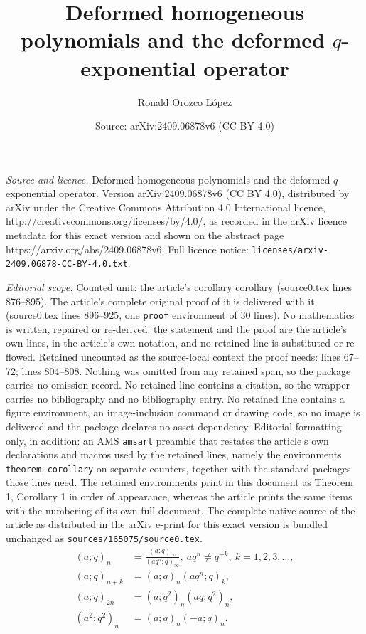 \documentclass[10pt,a4paper]{amsart}
\title{Deformed homogeneous polynomials and the deformed $q$-exponential operator}
\author{Ronald Orozco L\'opez}
\date{Source: arXiv:2409.06878v6 (CC BY 4.0)}
\begin{document}
\maketitle

\noindent\emph{Source and licence.} Deformed homogeneous polynomials and the deformed $q$-exponential operator. Version arXiv:2409.06878v6 (CC BY 4.0), distributed by arXiv under the Creative Commons Attribution 4.0 International licence, http://creativecommons.org/licenses/by/4.0/, as recorded in the arXiv licence metadata for this exact version and shown on the abstract page https://arxiv.org/abs/2409.06878v6. Full licence notice: \texttt{licenses/arxiv-2409.06878-CC-BY-4.0.txt}.\par\smallskip

\noindent\textit{Editorial scope.} Counted unit: the article's corollary corollary (source0.tex lines 876--895). The article's complete original proof of it is delivered with it (source0.tex lines 896--925, one \texttt{proof} environment of 30 lines). No mathematics is written, repaired or re-derived: the statement and the proof are the article's own lines, in the article's own notation, and no retained line is substituted or re-flowed.  Retained uncounted as the source-local context the proof needs: lines 67--72; lines 804--808.  Nothing was omitted from any retained span, so the package carries no omission record.  No retained line contains a citation, so the wrapper carries no bibliography and no bibliography entry.  No retained line contains a figure environment, an image-inclusion command or drawing code, so no image is delivered and the package declares no asset dependency.  Editorial formatting only, in addition: an AMS \texttt{amsart} preamble that restates the article's own declarations and macros used by the retained lines, namely the environments \texttt{theorem}, \texttt{corollary} on separate counters, together with the standard packages those lines need.  The retained environments print in this document as Theorem 1, Corollary 1 in order of appearance, whereas the article prints the same items with the numbering of its own full document.  The complete native source of the article as distributed in the arXiv e-print for this exact version is bundled unchanged as \texttt{sources/165075/source0.tex}.
\begin{align}
    (a;q)_{n}&=\frac{(a;q)_{\infty}}{(aq^n;q)_{\infty}},\ aq^n\neq q^{-k},\ k=1,2,3,\ldots,\label{eqn_iden1}\\
    (a;q)_{n+k}&=(a;q)_{n}(aq^{n};q)_{k},\label{eqn_iden2}\\
    (a;q)_{2n}&=(a;q^2)_{n}(aq;q^2)_{n},\label{eqn_iden3}\\
    (a^2;q^2)_{n}&=(a;q)_{n}(-a;q)_{n}.\label{eqn_iden4}
\end{align}
\end{document}
